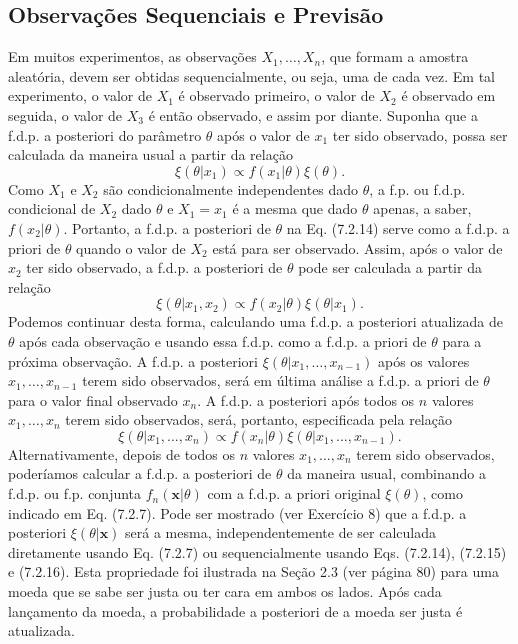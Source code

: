 \subsection*{Observações Sequenciais e Previsão}
Em muitos experimentos, as observações $X_1, \dots, X_n$, que formam a amostra aleatória, devem ser obtidas sequencialmente, ou seja, uma de cada vez. Em tal experimento, o valor de $X_1$ é observado primeiro, o valor de $X_2$ é observado em seguida, o valor de $X_3$ é então observado, e assim por diante. Suponha que a f.d.p. a posteriori do parâmetro $\theta$ após o valor de $x_1$ ter sido observado, possa ser calculada da maneira usual a partir da relação
\begin{equation}
\xi(\theta|x_1) \propto f(x_1|\theta)\xi(\theta). \tag{7.2.14}
\end{equation}
Como $X_1$ e $X_2$ são condicionalmente independentes dado $\theta$, a f.p. ou f.d.p. condicional de $X_2$ dado $\theta$ e $X_1=x_1$ é a mesma que dado $\theta$ apenas, a saber, $f(x_2|\theta)$. Portanto, a f.d.p. a posteriori de $\theta$ na Eq. (7.2.14) serve como a f.d.p. a priori de $\theta$ quando o valor de $X_2$ está para ser observado. Assim, após o valor de $x_2$ ter sido observado, a f.d.p. a posteriori de $\theta$ pode ser calculada a partir da relação
\begin{equation}
\xi(\theta|x_1, x_2) \propto f(x_2|\theta)\xi(\theta|x_1). \tag{7.2.15}
\end{equation}
Podemos continuar desta forma, calculando uma f.d.p. a posteriori atualizada de $\theta$ após cada observação e usando essa f.d.p. como a f.d.p. a priori de $\theta$ para a próxima observação. A f.d.p. a posteriori $\xi(\theta|x_1, \dots, x_{n-1})$ após os valores $x_1, \dots, x_{n-1}$ terem sido observados, será em última análise a f.d.p. a priori de $\theta$ para o valor final observado $x_n$. A f.d.p. a posteriori após todos os $n$ valores $x_1, \dots, x_n$ terem sido observados, será, portanto, especificada pela relação
\begin{equation}
\xi(\theta|x_1, \dots, x_n) \propto f(x_n|\theta)\xi(\theta|x_1, \dots, x_{n-1}). \tag{7.2.16}
\end{equation}
Alternativamente, depois de todos os $n$ valores $x_1, \dots, x_n$ terem sido observados, poderíamos calcular a f.d.p. a posteriori de $\theta$ da maneira usual, combinando a f.d.p. ou f.p. conjunta $f_n(\mathbf{x}|\theta)$ com a f.d.p. a priori original $\xi(\theta)$, como indicado em Eq. (7.2.7). Pode ser mostrado (ver Exercício 8) que a f.d.p. a posteriori $\xi(\theta|\mathbf{x})$ será a mesma, independentemente de ser calculada diretamente usando Eq. (7.2.7) ou sequencialmente usando Eqs. (7.2.14), (7.2.15) e (7.2.16). Esta propriedade foi ilustrada na Seção 2.3 (ver página 80) para uma moeda que se sabe ser justa ou ter cara em ambos os lados. Após cada lançamento da moeda, a probabilidade a posteriori de a moeda ser justa é atualizada.
